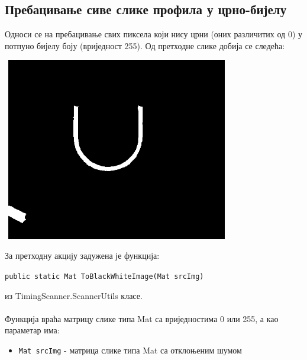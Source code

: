 \documentclass[12pt]{article}
\begin{document}
\subsection{Пребацивање сиве слике профила у црно-бијелу}
Односи се на пребацивање свих пиксела који нису црни (оних различитих од 0) у потпуно бијелу боју (вриједност 255). Од претходне слике добија се следећа:
\vspace{0.5cm}
\begin{center}
    \centering 
    \includegraphics[height=8cm, width=10cm]{images/4_black_white.png}
\end{center}
\vspace{0.5cm}
За претходну акцију задужена је функција:
\begin{center}
\texttt{public static Mat ToBlackWhiteImage(Mat srcImg)}
\end{center}
из TimingScanner.ScannerUtils класе.\\\\
Функција враћа матрицу слике типа Mat са вриједностима 0 или 255, а као параметар има:
\begin{itemize}
    \item \texttt{Mat srcImg} - матрица слике типа Mat са отклоњеним шумом
\end{itemize}

\newpage
\end{document}
